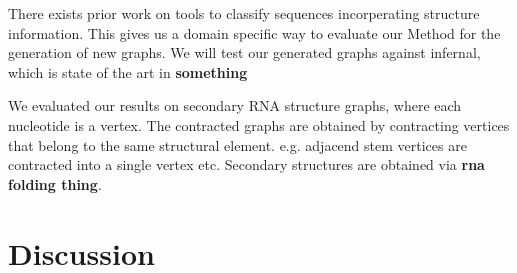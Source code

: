 \documentclass{article}
\begin{document}
There exists prior work on 
tools to classify sequences incorperating structure information. 
This gives us a domain specific way to evaluate our Method for the 
generation of new graphs. 
We will test our generated graphs against infernal, 
which is state of the art in \textbf{something }

We evaluated our results on secondary RNA structure graphs, where each 
nucleotide is a vertex. The contracted graphs are obtained by 
contracting vertices 
that belong to the same structural element.
e.g. adjacend stem vertices are contracted into a single vertex etc.
Secondary structures are obtained via \textbf{rna folding thing}.


\section{Discussion} 
\end{document}
